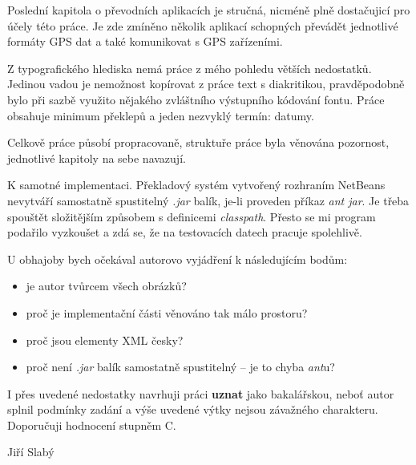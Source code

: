 \documentclass{article}
\begin{document}
Poslední kapitola o převodních aplikacích je stručná, nicméně plně
dostačujicí pro účely této práce. Je zde zmíněno několik aplikací schopných
převádět jednotlivé formáty GPS dat a také komunikovat s GPS zařízeními.

Z typografického hlediska nemá práce z mého pohledu větších nedostatků.
Jedinou vadou je nemožnost kopírovat z práce text s diakritikou, pravděpodobně
bylo při sazbě využito nějakého zvláštního výstupního kódování fontu.
Práce obsahuje minimum překlepů a jeden nezvyklý termín: datumy.

Celkově práce působí propracovaně, struktuře práce byla věnována pozornost,
jednotlivé kapitoly na sebe navazují.

K samotné implementaci. Překladový systém vytvořený rozhraním
NetBeans nevytváří samostatně spustitelný \textit{.jar} balík, je-li proveden
příkaz \textit{ant jar}. Je třeba
spouštět složitějším způsobem s definicemi \textit{classpath}. Přesto se mi
program podařilo vyzkoušet a zdá se, že na testovacích datech pracuje
spolehlivě.

U obhajoby bych očekával autorovo vyjádření k následujícím bodům:
\begin{itemize}
\setlength{\itemsep}{0pt}
\item je autor tvůrcem všech obrázků?
\item proč je implementační části věnováno tak málo prostoru?
\item proč jsou elementy XML česky?
\item proč není \textit{.jar} balík samostatně spustitelný -- je to chyba
\textit{ant}u?
\end{itemize}

I přes uvedené nedostatky navrhuji práci \textbf{uznat} jako bakalářskou,
neboť autor
splnil podmínky zadání a výše uvedené výtky nejsou závažného charakteru.
Doporučuji hodnocení stupněm C.

\begin{flushright}
Jiří Slabý
\end{flushright}
\end{document}
